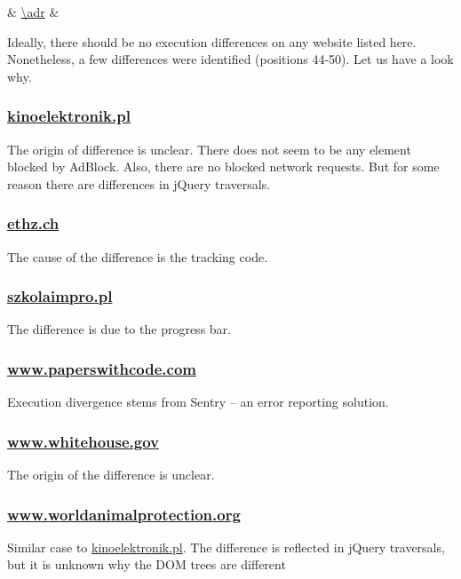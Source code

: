 %
{\thecsvrow & \url{\adr} & \cnt}%

Ideally, there should be no execution differences on any website listed here. Nonetheless, a few differences were identified (positions 44-50).
Let us have a look why.

\subsubsection{\url{kinoelektronik.pl}}
The origin of difference is unclear. There does not seem to be any element
blocked by AdBlock. Also, there are no blocked network requests. But for some reason there are differences in
jQuery traversals.

\subsubsection{\url{ethz.ch}}
The cause of the difference is the tracking code.

\subsubsection{\url{szkolaimpro.pl}}
The difference is due to the progress bar.

\subsubsection{\url{www.paperswithcode.com}}
Execution divergence stems from Sentry -- an error reporting solution.

\subsubsection{\url{www.whitehouse.gov}}
The origin of the difference is unclear.

\subsubsection{\url{www.worldanimalprotection.org}}
Similar case to \url{kinoelektronik.pl}. The difference is reflected in jQuery traversals,
but it is unknown why the DOM trees are different

